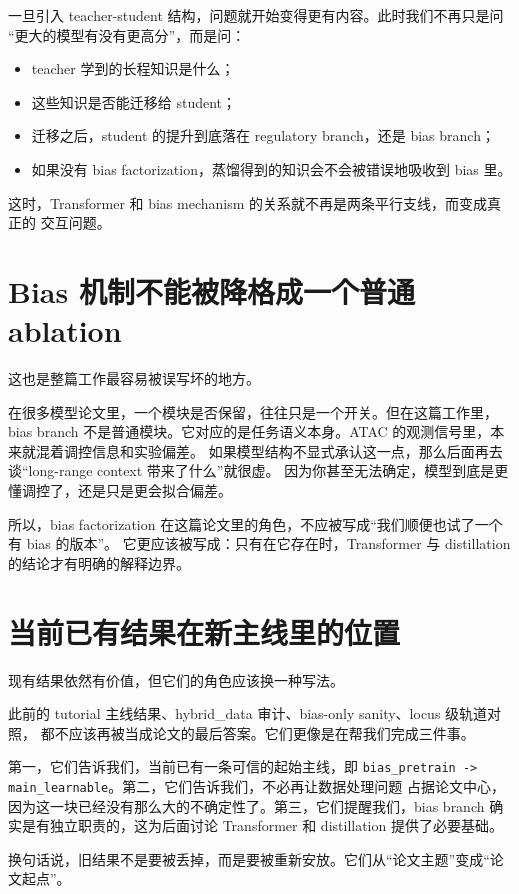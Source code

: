 \documentclass[11pt,a4paper]{ctexart}
\begin{document}
一旦引入 teacher-student 结构，问题就开始变得更有内容。此时我们不再只是问
“更大的模型有没有更高分”，而是问：

\begin{itemize}
  \item teacher 学到的长程知识是什么；
  \item 这些知识是否能迁移给 student；
  \item 迁移之后，student 的提升到底落在 regulatory branch，还是 bias branch；
  \item 如果没有 bias factorization，蒸馏得到的知识会不会被错误地吸收到 bias 里。
\end{itemize}

这时，Transformer 和 bias mechanism 的关系就不再是两条平行支线，而变成真正的
交互问题。

\section*{Bias 机制不能被降格成一个普通 ablation}

这也是整篇工作最容易被误写坏的地方。

在很多模型论文里，一个模块是否保留，往往只是一个开关。但在这篇工作里，bias branch
不是普通模块。它对应的是任务语义本身。ATAC 的观测信号里，本来就混着调控信息和实验偏差。
如果模型结构不显式承认这一点，那么后面再去谈“long-range context 带来了什么”就很虚。
因为你甚至无法确定，模型到底是更懂调控了，还是只是更会拟合偏差。

所以，bias factorization 在这篇论文里的角色，不应被写成“我们顺便也试了一个有 bias 的版本”。
它更应该被写成：只有在它存在时，Transformer 与 distillation 的结论才有明确的解释边界。

\section*{当前已有结果在新主线里的位置}

现有结果依然有价值，但它们的角色应该换一种写法。

此前的 tutorial 主线结果、hybrid\_data 审计、bias-only sanity、locus 级轨道对照，
都不应该再被当成论文的最后答案。它们更像是在帮我们完成三件事。

第一，它们告诉我们，当前已有一条可信的起始主线，即
\texttt{bias\_pretrain -> main\_learnable}。第二，它们告诉我们，不必再让数据处理问题
占据论文中心，因为这一块已经没有那么大的不确定性了。第三，它们提醒我们，bias branch
确实是有独立职责的，这为后面讨论 Transformer 和 distillation 提供了必要基础。

换句话说，旧结果不是要被丢掉，而是要被重新安放。它们从“论文主题”变成“论文起点”。
\end{document}
